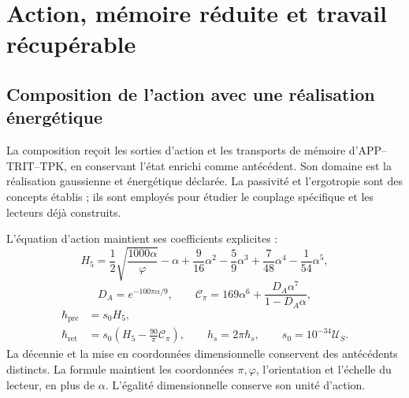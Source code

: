 \section{Action, mémoire réduite et travail récupérable}
\label{md:aux:trabajo}

\subsection{Composition de l’action avec une réalisation énergétique}
\label{md:aux:accion}

La composition reçoit les sorties d’action et les transports
de mémoire d’APP--TRIT--TPK, en conservant l’état enrichi
comme antécédent. Son domaine est la réalisation gaussienne et
énergétique déclarée. La passivité et l’ergotropie sont des concepts
établis ; ils sont employés pour étudier le couplage spécifique
et les lecteurs déjà construits.

L’équation d’action maintient ses coefficients explicites :
\begin{equation}
 H_5=\frac12\sqrt{\frac{1000\alpha}{\varphi}}-\alpha
 +\frac9{16}\alpha^2-\frac59\alpha^3
 +\frac7{48}\alpha^4-\frac1{54}\alpha^5,
 \label{md:aux:h5}
\end{equation}
\begin{equation}
 D_A=e^{-100\pi\alpha/9},\qquad
 \mathcal C_\pi=169\alpha^6+\frac{D_A\alpha^7}{1-D_A\alpha},
 \label{md:aux:correccion-accion}
\end{equation}
\begin{equation}
 \begin{aligned}
 \hbar_{\mathrm{pre}}&=s_0H_5,\\
 \hbar_{\mathrm{ret}}&=s_0\left(H_5-\frac{90}{\pi}\mathcal C_\pi\right),
 \qquad h_s=2\pi\hbar_s,\qquad s_0=10^{-34}\mathcal U_S.
 \end{aligned}
 \label{md:aux:secciones-accion}
\end{equation}
La décennie et la mise en coordonnées dimensionnelle conservent des antécédents
distincts. La formule maintient les coordonnées $\pi,\varphi$,
l’orientation et l’échelle du lecteur, en plus de $\alpha$.
L’égalité dimensionnelle conserve son unité d’action.

